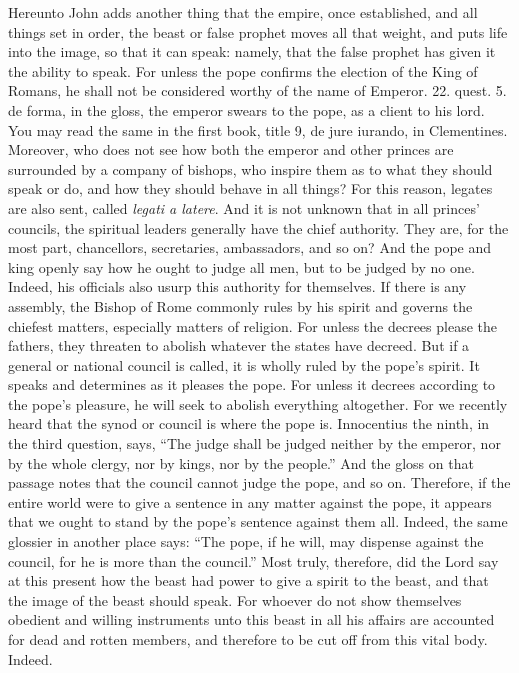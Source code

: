 Hereunto John adds another thing that the empire, once established, and all things set in order, the beast or false prophet moves all that weight, and puts life into the image, so that it can speak: namely, that the false prophet has given it the ability to speak. For unless the pope confirms the election of the King of Romans, he shall not be considered worthy of the name of Emperor. 22. quest. 5. de forma, in the gloss, the emperor swears to the pope, as a client to his lord. You may read the same in the first book, title 9, de jure iurando, in Clementines. Moreover, who does not see how both the emperor and other princes are surrounded by a company of bishops, who inspire them as to what they should speak or do, and how they should behave in all things? For this reason, legates are also sent, called \textit{legati a latere}. And it is not unknown that in all princes’ councils, the spiritual leaders generally have the chief authority. They are, for the most part, chancellors, secretaries, ambassadors, and so on? And the pope and king openly say how he ought to judge all men, but to be judged by no one. Indeed, his officials also usurp this authority for themselves. If there is any assembly, the Bishop of Rome commonly rules by his spirit and governs the chiefest matters, especially matters of religion. For unless the decrees please the fathers, they threaten to abolish whatever the states have decreed. But if a general or national council is called, it is wholly ruled by the pope’s spirit. It speaks and determines as it pleases the pope. For unless it decrees according to the pope’s pleasure, he will seek to abolish everything altogether. For we recently heard that the synod or council is where the pope is. Innocentius the ninth, in the third question, says, “The judge shall be judged neither by the emperor, nor by the whole clergy, nor by kings, nor by the people.” And the gloss on that passage notes that the council cannot judge the pope, and so on. Therefore, if the entire world were to give a sentence in any matter against the pope, it appears that we ought to stand by the pope’s sentence against them all. Indeed, the same glossier in another place says: “The pope, if he will, may dispense against the council, for he is more than the council.” Most truly, therefore, did the Lord say at this present how the beast had power to give a spirit to the beast, and that the image of the beast should speak. For whoever do not show themselves obedient and willing instruments unto this beast in all his affairs are accounted for dead and rotten members, and therefore to be cut off from this vital body. Indeed.

